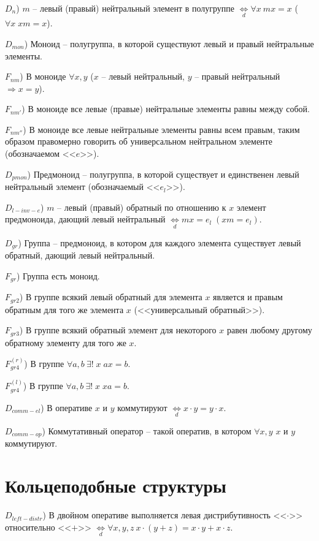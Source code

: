 \documentclass[a4paper]{article}
\newcommand{\Def}[0]{\underset{d}{\Leftrightarrow}}
\begin{document}
$D_n$) $m$ -- левый (правый) нейтральный элемент в полугруппе $\Def \forall x~mx = x$ ($\forall x \; xm = x$).

$D_{mon}$) Моноид -- полугруппа, в которой существуют левый и правый нейтральные элементы.

$F_{nm}$) В моноиде $\forall x, y$ ($x$ -- левый нейтральный, $y$ -- правый нейтральный $\Rightarrow x = y$).

$F_{nm'}$) В моноиде все левые (правые) нейтральные элементы равны между собой.

$F_{nm''}$) В моноиде все левые нейтральные элементы равны всем правым, таким образом правомерно говорить об универсальном нейтральном элементе (обозначаемом <<$e$>>).

$D_{pmon}$) Предмоноид -- полугруппа, в которой существует и единственен левый нейтральный элемент (обозначаемый <<$e_l$>>).

$D_{l-inv-e}$) $m$ -- левый (правый) обратный по отношению к $x$ элемент предмоноида, дающий левый нейтральный $\Def mx = e_l \; (xm = e_l).$

$D_{gr}$) Группа -- предмоноид, в котором для каждого элемента существует левый обратный, дающий левый нейтральный.

$F_{gr}$) Группа есть моноид.

$F_{gr2}$) В группе всякий левый обратный для элемента $x$ является и правым обратным для того же элемента $x$ (<<универсальный обратный>>).

$F_{gr3}$) В группе всякий обратный элемент для некоторого $x$ равен любому другому обратному элементу для того же $x$.

$F_{gr4}^{(r)}$) В группе $\forall a, b~\exists ! \; x \; ax = b.$

$F_{gr4}^{(l)}$) В группе $\forall a, b~\exists ! \; x \; xa = b.$

$D_{comm-el}$) В оперативе $x$ и $y$ коммутируют $\Def x \cdot y = y \cdot x.$

$D_{comm-op}$) Коммутативный оператор -- такой оператив, в котором $\forall x, y$ $x$ и $y$ коммутируют.

\section{Кольцеподобные структуры}

$D_{left-distr}$) В двойном оперативе выполняется левая дистрибутивность <<$\cdot$>> относительно <<$+$>> $\Def \forall x, y, z~x \cdot (y+z) = x \cdot y + x \cdot z.$
\end{document}

